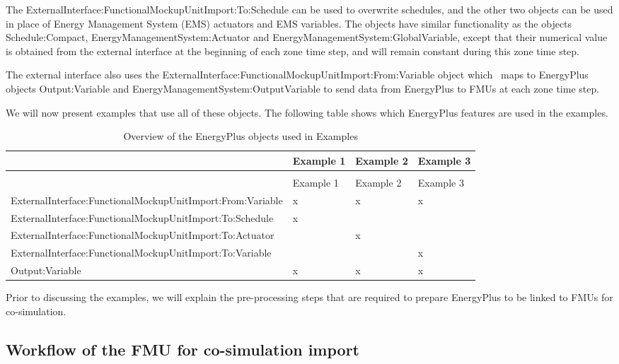 The ExternalInterface:FunctionalMockupUnitImport:To:Schedule can be used to overwrite schedules, and the other two objects can be used in place of Energy Management System (EMS) actuators and EMS variables. The objects have similar functionality as the objects Schedule:Compact, EnergyManagementSystem:Actuator and EnergyManagementSystem:GlobalVariable, except that their numerical value is obtained from the external interface at the beginning of each zone time step, and will remain constant during this zone time step.

The external interface also uses the ExternalInterface:FunctionalMockupUnitImport:From:Variable object which~ maps to EnergyPlus objects Output:Variable and EnergyManagementSystem:OutputVariable to send data from EnergyPlus to FMUs at each zone time step.

We will now present examples that use all of these objects. The following table shows which EnergyPlus features are used in the examples.

\begin{longtable}[c]{p{1.5in}p{1.5in}p{1.5in}p{1.5in}}
\caption{Overview of the EnergyPlus objects used in Examples \label{table:overview-of-the-energyplus-objects-used-in-001}} \tabularnewline
\toprule 
~ & Example 1 & Example 2 & Example 3 \tabularnewline
\midrule
\endfirsthead

\caption[]{Overview of the EnergyPlus objects used in Examples} \tabularnewline
\toprule 
~ & Example 1 & Example 2 & Example 3 \tabularnewline
\midrule
\endhead

ExternalInterface:FunctionalMockupUnitImport:From:Variable & x & x & x \tabularnewline
ExternalInterface:FunctionalMockupUnitImport:To:Schedule & x & ~ & ~ \tabularnewline
ExternalInterface:FunctionalMockupUnitImport:To:Actuator & ~ & x & ~ \tabularnewline
ExternalInterface:FunctionalMockupUnitImport:To:Variable & ~ & ~ & x \tabularnewline
Output:Variable & x & x & x \tabularnewline
\bottomrule
\end{longtable}

Prior to discussing the examples, we will explain the pre-processing steps that are required to prepare EnergyPlus to be linked to FMUs for co-simulation.

\subsection{Workflow of the FMU for co-simulation import}\label{workflow-of-the-fmu-for-co-simulation-import}

